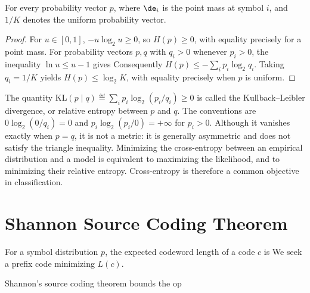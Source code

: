 \begin{lem} For every probability vector $p$,
where $\de_i$ is the point mass at symbol $i$, and $1/K$ denotes the uniform probability vector.
\end{lem}


\begin{proof}
For $u\in[0,1]$, $-u\log_2u\geq0$, so $H(p)\geq0$, with equality precisely for a point mass.
For probability vectors $p,q$ with $q_i>0$ whenever $p_i>0$, the inequality $\ln u\leq u-1$ gives
Consequently $H(p)\leq-\sum_i p_i\log_2q_i$. Taking $q_i=1/K$ yields $H(p)\leq\log_2K$, with equality precisely when $p$ is uniform.
\end{proof}

The quantity $\mathrm{KL}(p\mid q)\eqdef\sum_i p_i\log_2(p_i/q_i)\geq0$ is called the Kullback--Leibler divergence, or relative entropy between $p$ and $q$. The conventions are $0\log_2(0/q_i)=0$ and $p_i\log_2(p_i/0)=+\infty$ for $p_i>0$. Although it vanishes exactly when $p=q$, it is not a metric: it is generally asymmetric and does not satisfy the triangle inequality. Minimizing the cross-entropy between an empirical distribution and a model is equivalent to maximizing the likelihood, and to minimizing their relative entropy. Cross-entropy is therefore a common objective in classification.


                                                                    
\section{Shannon Source Coding Theorem}

For a symbol distribution $p$, the expected codeword length of a code $c$ is
We seek a prefix code minimizing $L(c)$.
 
Shannon's source coding theorem bounds the op
